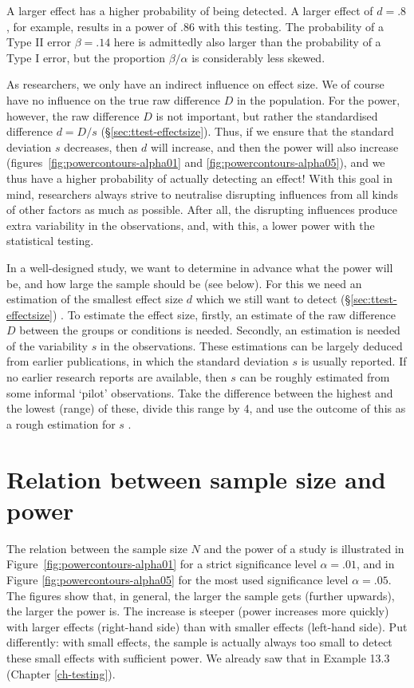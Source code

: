 \documentclass[
]{book}
\begin{document}
A larger effect has a higher probability of being detected. A larger
effect of \(d=.8\), for example, results in a power of
\(.86\) with this testing. The probability of a Type II error \(\beta=.14\) here is
admittedly also larger than the probability of a Type I error, but the
proportion \(\beta/\alpha\) is considerably less skewed.

As researchers, we only have an indirect influence on effect size.
We of course have no influence on the true raw difference \(D\) in the
population. For the power, however, the raw difference \(D\) is not
important, but rather the standardised difference \(d=D/s\)
(§\ref{sec:ttest-effectsize}). Thus, if we ensure that the standard
deviation \(s\) decreases, then \(d\) will increase,
and then the power will also increase
(figures~\ref{fig:powercontours-alpha01} and \ref{fig:powercontours-alpha05}),
and we thus have a higher probability
of actually detecting an effect!
With this goal in mind, researchers always strive to neutralise
disrupting influences from all kinds of other factors as much as possible.
After all, the disrupting influences produce extra variability in the observations, and,
with this, a lower power with the statistical testing.

In a well-designed study, we want to determine in advance what
the power will be, and how large the sample should be (see below).
For this we need an estimation of the smallest effect size \(d\)
which we still want to detect
(§\ref{sec:ttest-effectsize}) \citep{Quene10}. To estimate the effect size, firstly,
an estimate of the raw difference \(D\) between the groups or conditions is needed.
Secondly, an estimation is needed of the variability \(s\)
in the observations. These estimations can be largely deduced from
earlier publications, in which the standard deviation
\(s\) is usually reported. If no earlier research reports are available,
then \(s\) can be roughly estimated from some informal
`pilot' observations. Take the difference between the highest and the lowest
(range) of these, divide this range by 4, and use the outcome of this as
a rough estimation for \(s\) \citep{PD08}.

\hypertarget{sec:samplesize-power}{%
\section{Relation between sample size and power}\label{sec:samplesize-power}}

The relation between the sample size \(N\) and the power of a study
is illustrated in
Figure~\ref{fig:powercontours-alpha01} for a strict significance
level \(\alpha=.01\), and in
Figure \ref{fig:powercontours-alpha05} for the most used
significance level \(\alpha=.05\). The figures show that, in general, the larger the
sample gets (further upwards), the larger the power is.
The increase is steeper (power increases more quickly) with larger
effects (right-hand side) than with smaller effects (left-hand side). Put differently:
with small effects, the sample is actually always too small to detect
these small effects with sufficient power. We already saw that in
Example 13.3 (Chapter \ref{ch-testing}).
\end{document}
